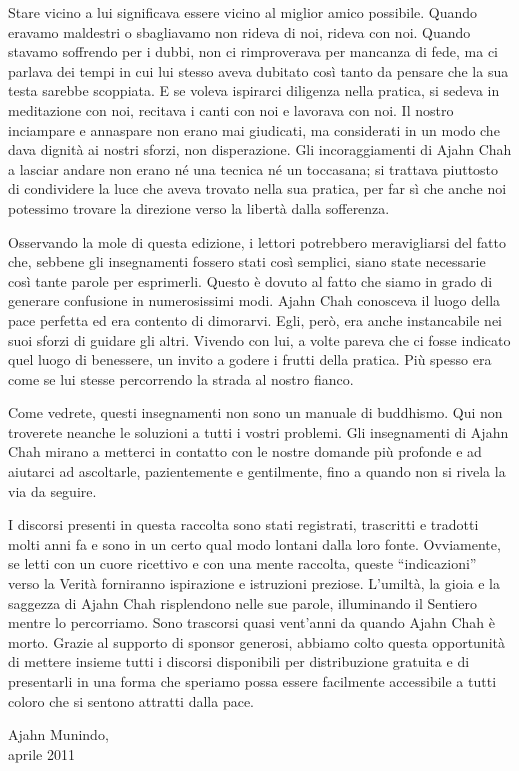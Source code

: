 Stare vicino a lui significava essere vicino al miglior amico possibile.
Quando eravamo maldestri o sbagliavamo non rideva di noi, rideva con
noi. Quando stavamo soffrendo per i dubbi, non ci rimproverava per
mancanza di fede, ma ci parlava dei tempi in cui lui stesso aveva
dubitato così tanto da pensare che la sua testa sarebbe scoppiata. E se
voleva ispirarci diligenza nella pratica, si sedeva in meditazione con
noi, recitava i canti con noi e lavorava con noi. Il nostro inciampare e
annaspare non erano mai giudicati, ma considerati in un modo che dava
dignità ai nostri sforzi, non disperazione. Gli incoraggiamenti di Ajahn
Chah a lasciar andare non erano né una tecnica né un toccasana; si
trattava piuttosto di condividere la luce che aveva trovato nella sua
pratica, per far sì che anche noi potessimo trovare la direzione verso
la libertà dalla sofferenza.

Osservando la mole di questa edizione, i lettori potrebbero
meravigliarsi del fatto che, sebbene gli insegnamenti fossero stati così
semplici, siano state necessarie così tante parole per esprimerli.
Questo è dovuto al fatto che siamo in grado di generare confusione in
numerosissimi modi. Ajahn Chah conosceva il luogo della pace perfetta ed
era contento di dimorarvi. Egli, però, era anche instancabile nei suoi
sforzi di guidare gli altri. Vivendo con lui, a volte pareva che ci
fosse indicato quel luogo di benessere, un invito a godere i frutti
della pratica. Più spesso era come se lui stesse percorrendo la strada
al nostro fianco.

Come vedrete, questi insegnamenti non sono un manuale di buddhismo. Qui
non troverete neanche le soluzioni a tutti i vostri problemi. Gli
insegnamenti di Ajahn Chah mirano a metterci in contatto con le nostre
domande più profonde e ad aiutarci ad ascoltarle, pazientemente e
gentilmente, fino a quando non si rivela la via da seguire.

I discorsi presenti in questa raccolta sono stati registrati, trascritti
e tradotti molti anni fa e sono in un certo qual modo lontani dalla loro
fonte. Ovviamente, se letti con un cuore ricettivo e con una mente
raccolta, queste ``indicazioni'' verso la Verità forniranno ispirazione
e istruzioni preziose. L'umiltà, la gioia e la saggezza di Ajahn Chah
risplendono nelle sue parole, illuminando il Sentiero mentre lo
percorriamo. Sono trascorsi quasi vent'anni da quando Ajahn Chah è
morto. Grazie al supporto di sponsor generosi, abbiamo colto questa
opportunità di mettere insieme tutti i discorsi disponibili per
distribuzione gratuita e di presentarli in una forma che speriamo possa
essere facilmente accessibile a tutti coloro che si sentono attratti
dalla pace.

\bigskip

{\raggedleft
  Ajahn Munindo,\\
  aprile 2011
\par}
